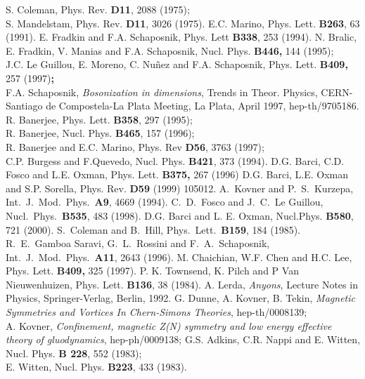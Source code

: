 \documentclass[a4paper,12pt]{article}
\begin{document}
\newpage
\begin{thebibliography}{9}
   S. Coleman, Phys. Rev. {\bf D11}, 2088 (1975); \\S.
  Mandelstam, Phys. Rev. {\bf D11}, 3026 (1975).
 E.C. Marino, Phys. Lett. {\bf B263}, 63 (1991).
 E. Fradkin and F.A. Schaposnik, Phys. Lett {\bf
    B338}, 253 (1994).
 N. Bralic, E. Fradkin, V. Manias and F.A.
  Schaposnik,
  Nucl.  Phys. {\bf B446, }144 (1995);\\ J.C. Le Guillou, E. Moreno,
  C. Nu\~{n}ez and F.A. Schaposnik, Phys. Lett. {\bf B409, }257
  (1997){\bf ; }\\ F.A.  Schaposnik, {\it Bosonization in \coordHE{}
    dimensions}, Trends in Theor. Physics, CERN-Santiago de
  Compostela-La Plata Meeting, La Plata, April 1997, hep-th/9705186.
 R. Banerjee, Phys. Lett. {\bf B358}, 297 (1995); \\
  R.  Banerjee, Nucl. Phys. {\bf B465}, 157 (1996);\\ R. Banerjee and
  E.C. Marino, Phys. Rev {\bf D56}, 3763 (1997);\\ C.P. Burgess and
  F.Quevedo, Nucl. Phys.  {\bf B421}, 373 (1994).
  D.G. Barci, C.D. Fosco and L.E. Oxman, Phys. Lett. {\bf %
    B375,} 267 (1996)
 D.G. Barci, L.E. Oxman and S.P. Sorella,
  Phys. Rev.  {\bf D59} (1999) 105012.
A.~Kovner and P.~S.~Kurzepa,
Int.\ J.\ Mod.\ Phys.\  {\bf A9}, 4669 (1994).
C.~D.~Fosco and J.~C.~Le Guillou,
Nucl.\ Phys.\  {\bf B535}, 483 (1998).
 D.G. Barci and L. E. Oxman, Nucl.Phys. {\bf B580}, 721
  (2000).
S.~Coleman and B.~Hill,
  Phys.~Lett.~{\bf B159}, 184 (1985).
 R.~E.~Gamboa Saravi, G.~L.~Rossini and F.~A.~Schaposnik,
Int.\ J.\ Mod.\ Phys.\  {\bf A11}, 2643 (1996).
  M. Chaichian, W.F. Chen and H.C. Lee, Phys. Lett. {\bf %
    B409,} 325 (1997).
 P. K. Townsend, K. Pilch and P Van Nieuwenhuizen,
  Phys. Lett. {\bf B136}, 38 (1984).
A. Lerda, {\em Anyons}, Lecture Notes in Physics,
  Springer-Verlag, Berlin, 1992.
 G. Dunne, A. Kovner, B. Tekin, {\it Magnetic Symmetries and Vortices In Chern-Simons Theories}, {hep-th/0008139}; \\
 A. Kovner, {\it Confinement, magnetic Z(N) symmetry and low energy effective theory of gluodynamics}, {hep-ph/0009138}; 
 G.S. Adkins, C.R. Nappi and E. Witten, Nucl. Phys. {\bf B 228}, 
552 (1983);\\E. Witten, Nucl. Phys. {\bf B223}, 433 (1983).
  
\end{thebibliography}
\end{document}
